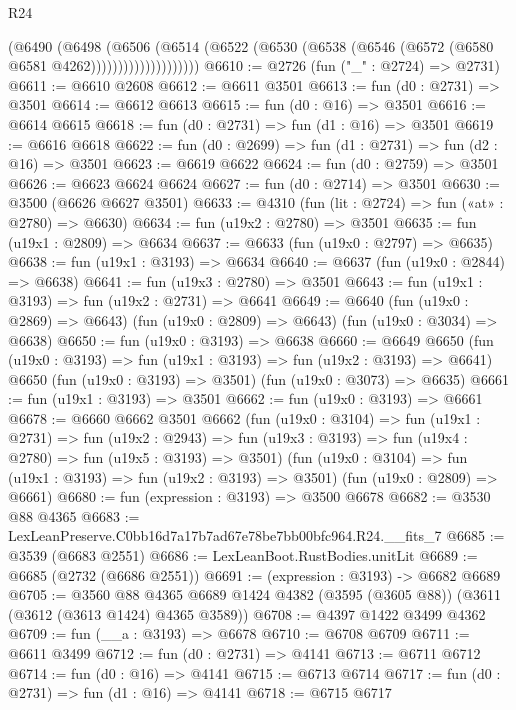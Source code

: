 \begin{lexlean}{R24}
\begin{coremodule}
                        (@6490
                          (@6498
                            (@6506
                              (@6514
                                (@6522
                                  (@6530 (@6538 (@6546 (@6572 (@6580 @6581 @4262))))))))))))))))))))
@6610 := @2726 (fun ("_" : @2724) => @2731)
@6611 := @6610 @2608
@6612 := @6611 @3501
@6613 := fun (d0 : @2731) => @3501
@6614 := @6612 @6613
@6615 := fun (d0 : @16) => @3501
@6616 := @6614 @6615
@6618 := fun (d0 : @2731) => fun (d1 : @16) => @3501
@6619 := @6616 @6618
@6622 := fun (d0 : @2699) => fun (d1 : @2731) => fun (d2 : @16) => @3501
@6623 := @6619 @6622
@6624 := fun (d0 : @2759) => @3501
@6626 := @6623 @6624 @6624
@6627 := fun (d0 : @2714) => @3501
@6630 := @3500 (@6626 @6627 @3501)
@6633 := @4310 (fun (lit : @2724) => fun («at» : @2780) => @6630)
@6634 := fun (u19x2 : @2780) => @3501
@6635 := fun (u19x1 : @2809) => @6634
@6637 := @6633 (fun (u19x0 : @2797) => @6635)
@6638 := fun (u19x1 : @3193) => @6634
@6640 := @6637 (fun (u19x0 : @2844) => @6638)
@6641 := fun (u19x3 : @2780) => @3501
@6643 := fun (u19x1 : @3193) => fun (u19x2 : @2731) => @6641
@6649 := @6640
    (fun (u19x0 : @2869) => @6643)
    (fun (u19x0 : @2809) => @6643)
    (fun (u19x0 : @3034) => @6638)
@6650 := fun (u19x0 : @3193) => @6638
@6660 := @6649
    @6650
    (fun (u19x0 : @3193) => fun (u19x1 : @3193) => fun (u19x2 : @3193) => @6641)
    @6650
    (fun (u19x0 : @3193) => @3501)
    (fun (u19x0 : @3073) => @6635)
@6661 := fun (u19x1 : @3193) => @3501
@6662 := fun (u19x0 : @3193) => @6661
@6678 := @6660
    @6662
    @3501
    @6662
    (fun (u19x0 : @3104) =>
    fun (u19x1 : @2731) =>
    fun (u19x2 : @2943) =>
    fun (u19x3 : @3193) => fun (u19x4 : @2780) => fun (u19x5 : @3193) => @3501)
    (fun (u19x0 : @3104) => fun (u19x1 : @3193) => fun (u19x2 : @3193) => @3501)
    (fun (u19x0 : @2809) => @6661)
@6680 := fun (expression : @3193) => @3500 @6678
@6682 := @3530 @88 @4365
@6683 := LexLeanPreserve.C0bb16d7a17b7ad67e78be7bb00bfc964.R24.__fits_7
@6685 := @3539 (@6683 @2551)
@6686 := LexLeanBoot.RustBodies.unitLit
@6689 := @6685 (@2732 (@6686 @2551))
@6691 := (expression : @3193) -> @6682 @6689
@6705 := @3560
    @88
    @4365
    @6689
    @1424
    @4382
    (@3595 (@3605 @88))
    (@3611 (@3612 (@3613 @1424) @4365 @3589))
@6708 := @4397 @1422 @3499 @4362
@6709 := fun (__a : @3193) => @6678
@6710 := @6708 @6709
@6711 := @6611 @3499
@6712 := fun (d0 : @2731) => @4141
@6713 := @6711 @6712
@6714 := fun (d0 : @16) => @4141
@6715 := @6713 @6714
@6717 := fun (d0 : @2731) => fun (d1 : @16) => @4141
@6718 := @6715 @6717

\end{coremodule}
\end{lexlean}
